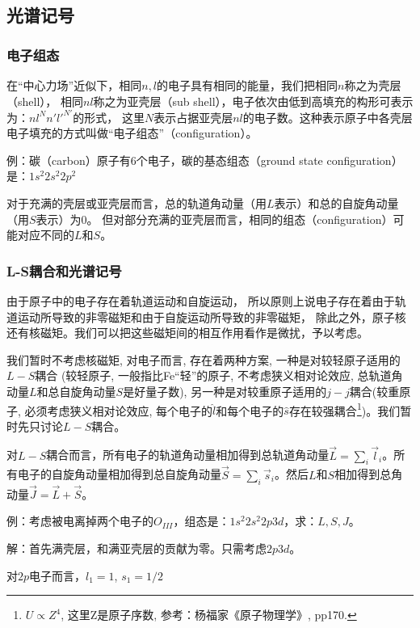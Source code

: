 \subsection{光谱记号}

\subsubsection{电子组态}


在“中心力场”近似下，相同$n,l$的电子具有相同的能量，我们把相同$n$称之为壳层（shell），
相同$nl$称之为亚壳层（sub
shell），电子依次由低到高填充的构形可表示为：$nl^{N}n'l'^{N'}$的形式，
这里$N$表示占据亚壳层$nl$的电子数。这种表示原子中各壳层电子填充的方式叫做``电子组态''（configuration）。

例：碳（carbon）原子有6个电子，碳的基态组态（ground state
configuration）是：$1s^2 2s^2 2p^2$

对于充满的壳层或亚壳层而言，总的轨道角动量（用$L$表示）和总的自旋角动量（用$S$表示）为0。
但对部分充满的亚壳层而言，相同的组态（configuration）可能对应不同的$L$和$S$。

\subsubsection{L-S耦合和光谱记号}

由于原子中的电子存在着轨道运动和自旋运动，
所以原则上说电子存在着由于轨道运动所导致的非零磁矩和由于自旋运动所导致的非零磁矩，
除此之外，原子核还有核磁矩。我们可以把这些磁矩间的相互作用看作是微扰，予以考虑。

我们暂时不考虑核磁矩, 对电子而言, 存在着两种方案,
一种是对较轻原子适用的$L-S$耦合 (较轻原子, 一般指比Fe“轻”的原子,
不考虑狭义相对论效应, 总轨道角动量$L$和总自旋角动量$S$是好量子数),
另一种是对较重原子适用的$j-j$耦合(较重原子, 必须考虑狭义相对论效应,
每个电子的$\hat l$和每个电子的$\hat s$存在较强耦合\footnote{$U
\propto Z^4$, 这里Z是原子序数, 参考：杨福家《原子物理学》,
pp170.})。我们暂时先只讨论$L-S$耦合。

对$L-S$耦合而言，所有电子的轨道角动量相加得到总轨道角动量$\vec
L=\sum \limits_i \vec
l_i$。所有电子的自旋角动量相加得到总自旋角动量$\vec S =\sum
\limits_i \vec s_i$。然后$L$和$S$相加得到总角动量$\vec J = \vec L +
\vec S$。

例：考虑被电离掉两个电子的$O_{III}$，组态是：$1s^2 2s^2
2p3d$，求：$L,S,J$。

解：首先满壳层，和满亚壳层的贡献为零。只需考虑$2p3d$。

对$2p$电子而言，$l_1=1$, $s_1=1/2$

